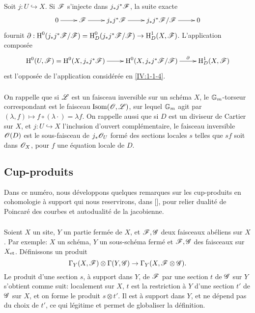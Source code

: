 Soit $j:U\hookrightarrow X$. Si $\mathscr{F}$ s'injecte dans $j_* j^* \mathscr{F}$, la suite 
exacte 
\[\xymatrix{
  0 \ar[r] 
  & \cF \ar[r]
  & j_* j^* \cF \ar[r]
  & j_* j^* \cF / \cF \ar[r]
  & 0
}\]
fournit 
$\partial:\operatorname{H}^0(j_* j^*\mathscr{F}/\mathscr{F}) = \operatorname{H}_D^0(j_* j^* \mathscr{F}/\mathscr{F}) \to \operatorname{H}_D^1(X,\mathscr{F})$. 
L'application composée 
\[\xymatrix{
  \h^0(U,\cF) = \h^0(X,j_* j^*\cF) \ar[r] 
    & \h^0(X,j_* j^*\cF / \cF) \ar[r]^-\partial 
    & \h_D^1(X,\cF)
}\]
est l'opposée de l'application considérée en \ref{IV:1-1-4}. 





\subsubsection{}\label{IV:1-1-6}

On rappelle que si $\mathscr{L}$ est un faisceau inversible sur un schéma $X$, le 
$\mathbb{G}_m$-torseur correspondant est le faisceau $\operatorname{Isom}(\mathscr{O},\mathscr{L})$, 
sur lequel $\mathbb{G}_m$ agit par 
$(\lambda,f)\mapsto f\circ (\lambda\cdot) = \lambda f$. On rappelle aussi que 
si $D$ est un diviseur de Cartier sur $X$, et $j:U\hookrightarrow X$ 
l'inclusion d'ouvert complémentaire, le faisceau inversible $\mathscr{O}(D)$ est le 
sous-faisceau de $j_*\mathscr{O}_U$ formé des sections locales $s$ telles que $s f$ 
soit dans $\mathscr{O}_X$, pour $f$ une équation locale de $D$.










\subsection{Cup-produits}\label{IV:1-2}

Dans ce numéro, nous développons quelques remarques sur les cup-produits en 
cohomologie à support qui nous reservirons, dans [], pour relier 
dualité de Poincaré des courbes et autodualité de la jacobienne.

\subsubsection{}\label{IV:1-2-1}

Soient $X$ un site, $Y$ un partie fermée de $X$, et $\mathscr{F},\mathscr{G}$ deux faisceaux 
abéliens sur $X$. Par exemple: $X$ un schéma, $Y$ un sous-schéma fermé 
et $\mathscr{F},\mathscr{G}$ des faisceaux sur ${X}_{\textnormal{et}}$. Définissons un produit 
\begin{equation}\label{IV:eq:1-2-1-1}
  \Gamma_Y(X,\mathscr{F})\otimes \Gamma(Y,\mathscr{G}) \to \Gamma_Y(X,\mathscr{F}\otimes\mathscr{G}) \text{.}
\end{equation}
Le produit d'une section $s$, à support dans $Y$, de $\mathscr{F}$ par une section 
$t$ de $\mathscr{G}$ sur $Y$ s'obtient comme suit: localement sur $X$, $t$ est la 
restriction à $Y$ d'une section $t'$ de $\mathscr{G}$ sur $X$, et on forme le produit 
$s\otimes t'$. Il est à support dans $Y$, et ne dépend pas du choix de 
$t'$, ce qui légitime et permet de globaliser la définition.

